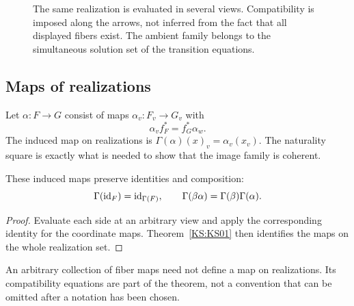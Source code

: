 \begin{figure}[htbp]\centering{}\caption{The same realization is evaluated in several views. Compatibility is imposed along the arrows, not inferred from the fact that all displayed fibers exist. The ambient family belongs to the simultaneous solution set of the transition equations.}\label{KS:fig:views}\end{figure}

\subsection{Maps of realizations}
Let \(\alpha:F\to G\) consist of maps \(\alpha_v:F_v\to G_v\) with
\[
 \alpha_v f_F^*=f_G^*\alpha_w.
\]
The induced map on realizations is \(\Gamma(\alpha)(x)_v=\alpha_v(x_v)\). The naturality square is exactly what is needed to show that the image family is coherent.

\begin{KSproposition}\label{KS:KS02}
These induced maps preserve identities and composition:
\[
 \Gamma(\operatorname{id}_F)=\operatorname{id}_{\Gamma(F)},\qquad
 \Gamma(\beta\alpha)=\Gamma(\beta)\Gamma(\alpha).
\]
\end{KSproposition}
\begin{proof}
Evaluate each side at an arbitrary view and apply the corresponding identity for the coordinate maps. Theorem~\ref{KS:KS01} then identifies the maps on the whole realization set.
\end{proof}
An arbitrary collection of fiber maps need not define a map on realizations. Its compatibility equations are part of the theorem, not a convention that can be omitted after a notation has been chosen.

